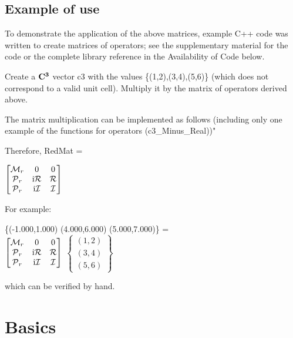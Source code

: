 \documentclass[preprint]{iucr}              %
\numberwithin{equation}{section}
\newcommand{\CIII}[0]{$\bf{C^{3}}$}
\newcommand{\Imaginary}[0]{\mathcal{I}}
\newcommand{\Real}[0]{\mathcal{R}}
\begin{document}
\subsection{Example of use}

To demonstrate the application of the above matrices,
example C++ code was written to create matrices of operators;
see the supplementary material for the code or the complete
library reference in the Availability of Code below.

Create a \CIII{} vector c3 with
the values \{(1,2),(3,4),(5,6)\} (which does not
correspond to a valid unit cell). Multiply it by the matrix
of operators derived above.

The matrix multiplication can be implemented as follows (including
only one example of the functions for operators (c3\_Minus\_Real))"

Therefore, RedMat = \\
\begin{center}
	$\begin{bmatrix}
		\Minus{}_r	& 0			& 0 \\
		\Plus{}_r	&  \textrm{i}\Real{}	& \Real{} \\
		\Plus{}_r	& \textrm{i}\Imaginary{}		&\Imaginary{}
	\end{bmatrix}	$
\end{center}

For example:

\begin{center}
	\{(-1.000,1.000) (4.000,6.000) (5.000,7.000)\} =\\
	$\begin{bmatrix}
		\Minus{}_r	& 0			& 0 \\
\Plus{}_r	&  \textrm{i}\Real{}	& \Real{} \\
\Plus{}_r	& \textrm{i}\Imaginary{}		&\Imaginary{}
	\end{bmatrix}	$
	$\begin{Bmatrix}
		(1,2)\\
		(3,4)\\
		(5,6)
	\end{Bmatrix}$\\
	
\end{center}

which can be verified by hand.



	
	\section{Basics}
	
\end{document}
